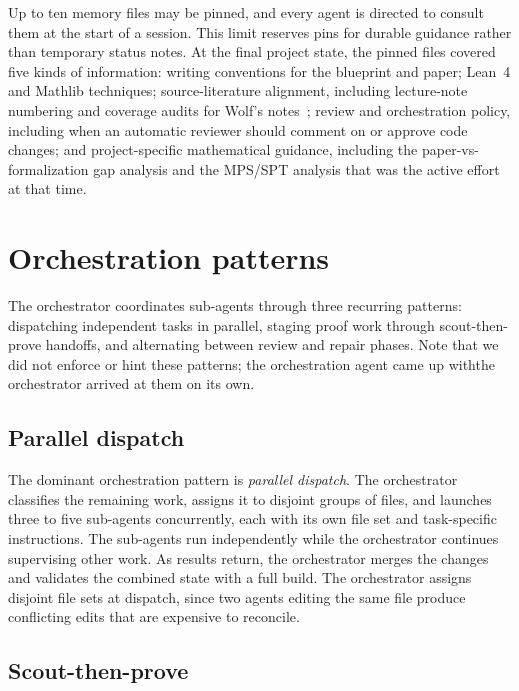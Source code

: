 Up to ten memory files may be pinned, and every agent is directed to consult them at the start of a session. This limit reserves pins for durable guidance rather than temporary status notes. At the final project state, the pinned files covered five kinds of information: writing conventions for the blueprint and paper; Lean~4 and Mathlib techniques; source-literature alignment, including lecture-note numbering and coverage audits for Wolf's notes~\cite{Wolf2012Quantum}; review and orchestration policy, including when an automatic reviewer should comment on or approve code changes; and project-specific mathematical guidance, including the paper-vs-formalization gap analysis and the MPS/SPT analysis that was the active effort at that time.


\section{Orchestration patterns}\label{app:orchestration}

The orchestrator coordinates sub-agents through three recurring patterns: dispatching independent tasks in parallel, staging proof work through scout-then-prove handoffs, and alternating between review and repair phases. Note that we did not enforce or hint these patterns; the orchestration agent came up withthe orchestrator arrived at them on its own.

\subsection{Parallel dispatch}\label{sec:fanout}

The dominant orchestration pattern is \textit{parallel dispatch}. The orchestrator classifies the remaining work, assigns it to disjoint groups of files, and launches three to five sub-agents concurrently, each with its own file set and task-specific instructions.
The sub-agents run independently while the orchestrator continues supervising other work. As results return, the orchestrator merges the changes and validates the combined state with a full build.
The orchestrator assigns disjoint file sets at dispatch, since two agents editing the same file produce conflicting edits that are expensive to reconcile.

\subsection{Scout-then-prove}\label{sec:scout_impl}

